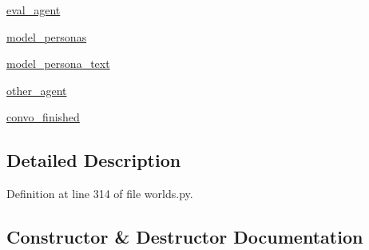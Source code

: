 \begin{DoxyCompactItemize}
\item 
\hyperlink{classprojects_1_1controllable__dialogue_1_1mturk_1_1worlds_1_1ControllableDialogEval_a0516aa56cda570506cc8b5efb02756cc}{eval\+\_\+agent}
\item 
\hyperlink{classprojects_1_1controllable__dialogue_1_1mturk_1_1worlds_1_1ControllableDialogEval_a77c385abcd738bbd5a15cdbe0289262d}{model\+\_\+personas}
\item 
\hyperlink{classprojects_1_1controllable__dialogue_1_1mturk_1_1worlds_1_1ControllableDialogEval_a0fe27b63b91f7f009e6a8afcae66db74}{model\+\_\+persona\+\_\+text}
\item 
\hyperlink{classprojects_1_1controllable__dialogue_1_1mturk_1_1worlds_1_1ControllableDialogEval_a327f0cfe1f11bcd29b129dda9b7c6cb4}{other\+\_\+agent}
\item 
\hyperlink{classprojects_1_1controllable__dialogue_1_1mturk_1_1worlds_1_1ControllableDialogEval_ae50ceac205de37d75020d34c8de50d36}{convo\+\_\+finished}
\end{DoxyCompactItemize}


\subsection{Detailed Description}


Definition at line 314 of file worlds.\+py.



\subsection{Constructor \& Destructor Documentation}
\mbox{\label{classprojects_1_1controllable__dialogue_1_1mturk_1_1worlds_1_1ControllableDialogEval_af8577bcfacb6749666bb1f86a37add05}} 
